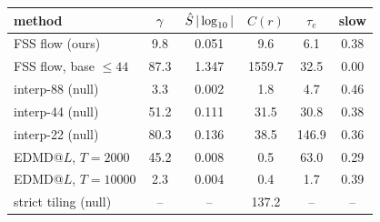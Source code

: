 \begin{tabular}{lccccc}
\toprule
method & $\gamma$ & $\hat S\,|\log_{10}|$ & $C(r)$ & $\tau_e$ & slow \\
\midrule
FSS flow (ours) & 9.8 & 0.051 & 9.6 & 6.1 & 0.38 \\
FSS flow, base $\le 44$ & 87.3 & 1.347 & 1559.7 & 32.5 & 0.00 \\
interp-88 (null) & 3.3 & 0.002 & 1.8 & 4.7 & 0.46 \\
interp-44 (null) & 51.2 & 0.111 & 31.5 & 30.8 & 0.38 \\
interp-22 (null) & 80.3 & 0.136 & 38.5 & 146.9 & 0.36 \\
EDMD@$L$, $T{=}2000$ & 45.2 & 0.008 & 0.5 & 63.0 & 0.29 \\
EDMD@$L$, $T{=}10000$ & 2.3 & 0.004 & 0.4 & 1.7 & 0.39 \\
strict tiling (null) & -- & -- & 137.2 & -- & -- \\
\bottomrule
\end{tabular}
